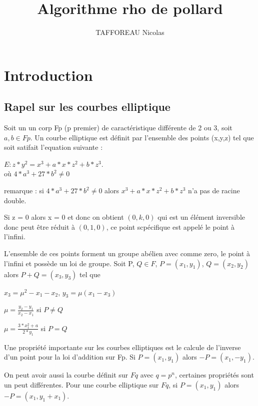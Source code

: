 \documentclass[a4paper,10pt]{report}
\title{Algorithme rho de pollard}
\author{TAFFOREAU Nicolas}
\begin{document}
\maketitle
\tableofcontents
\chapter{Introduction}

\section{Rapel sur les courbes elliptique}

    Soit un un corp Fp (p premier) de caractéristique différente de 2 ou 3, soit $a, b \in Fp$.
    Un courbe elliptique est définit par l'ensemble des points (x,y,z) tel que soit satifait l'equation suivante :
  \begin{center}
    $E : z*y^2 = x^3 + a*x*z^2 + b*z^3$.   \\
    où $ 4*a^3 + 27*b^2 \ne 0$
  \end{center}

  remarque : si $ 4*a^3 + 27*b^2 \ne 0$ alors  $x^3 + a*x*z^2 + b*z^3$ n'a pas de racine double.
  
  Si z = 0 alors x = 0 et donc on obtient $(0,k,0)$ qui est un élément inversible donc peut être réduit à $(0,1,0)$, ce point scpécifique est appelé le point à l'infini.

  L'ensemble de ces points forment un groupe abélien avec comme zero, le point à l'infini et possède un loi de groupe.
  Soit P, $Q \in F$, $ P = (x_1,y_1)$, $Q = (x_2,y_2)$ alors $P+Q = (x_3,y_3)$ tel que 
    \begin{center}
      $x_3 = \mu^2 -x_1 - x_2$, $y_3 = \mu(x_1-x_3)$
    \end{center}
    \begin{center}
      $\mu = \frac{y_2 - y_1}{x_2 - x_1}$ si $P \ne Q$
    \end{center}
    \begin{center}
      $\mu = \frac{3*x_1^2 + a}{2*y_1}$ si $P = Q$
    \end{center}


Une propriété importante sur les courbes elliptiques est le calcule de l'inverse d'un point pour la loi d'addition sur Fp. Si $P = (x_1,y_1)$ alors $-P = (x_1,-y_1)$.

On peut avoir aussi la courbe définit sur $Fq$ avec $q = p^n$, certaines propriétés sont un peut différentes.
Pour une courbe elliptique sur $Fq$, si $P = (x_1,y_1)$ alors $-P = (x_1,y_1+x_1)$.
\end{document}
